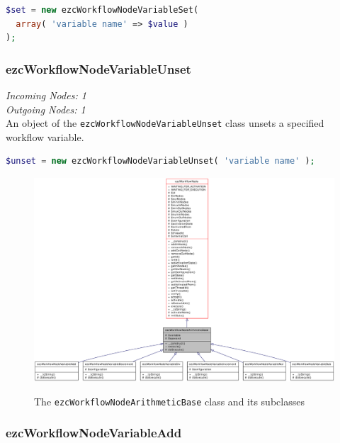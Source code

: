 \begin{lstlisting}[language=PHP]
$set = new ezcWorkflowNodeVariableSet(
  array( 'variable name' => $value )
);
\end{lstlisting}

\subsubsection{ezcWorkflowNodeVariableUnset}

\emph{Incoming Nodes: 1}\\
\emph{Outgoing Nodes: 1}\\

An object of the \texttt{ezcWorkflowNodeVariableUnset} class unsets a
specified workflow variable.

\begin{lstlisting}[language=PHP]
$unset = new ezcWorkflowNodeVariableUnset( 'variable name' );
\end{lstlisting}

\begin{figure}[hbt]
\begin{center}
\includegraphics[width=16cm]{figures/WorkflowNodeArithmeticBase}\\[5mm]
\end{center}
\caption{The \texttt{ezcWorkflowNodeArithmeticBase} class and its subclasses}
\label{classezcWorkflowNodeArithmeticBase}
\end{figure}

\subsubsection{ezcWorkflowNodeVariableAdd}

